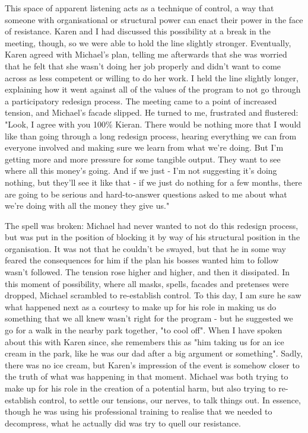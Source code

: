This space of apparent listening acts as a technique of control, a way that someone with organisational or structural power can enact their power in the face of resistance. Karen and I had discussed this possibility at a break in the meeting, though, so we were able to hold the line slightly stronger. Eventually, Karen agreed with Michael's plan, telling me afterwards that she was worried that he felt that she wasn't doing her job properly and didn't want to come across as less competent or willing to do her work. I held the line slightly longer, explaining how it went against all of the values of the program to not go through a participatory redesign process. The meeting came to a point of increased tension, and Michael's facade slipped. He turned to me, frustrated and flustered:
"Look, I agree with you 100\% Kieran. There would be nothing more that I would like than going through a long redesign process, hearing everything we can from everyone involved and making sure we learn from what we're doing. But I'm getting more and more pressure for some tangible output. They want to see where all this money's going. And if we just - I'm not suggesting it's doing nothing, but they'll see it like that - if we just do nothing for a few months, there are going to be serious and hard-to-answer questions asked to me about what we're doing with all the money they give us."

The spell was broken: Michael had never wanted to not do this redesign process, but was put in the position of blocking it by way of his structural position in the organisation. It was not that he couldn't be swayed, but that he in some way feared the consequences for him if the plan his bosses wanted him to follow wasn't followed. The tension rose higher and higher, and then it dissipated. In this moment of possibility, where all masks, spells, facades and pretenses were dropped, Michael scrambled to re-establish control. To this day, I am sure he saw what happened next as a courtesy to make up for his role in making us do something that we all knew wasn't right for the program - but he suggested we go for a walk in the nearby park together, "to cool off". When I have spoken about this with Karen since, she remembers this as "him taking us for an ice cream in the park, like he was our dad after a big argument or something". Sadly, there was no ice cream, but Karen's impression of the event is somehow closer to the truth of what was happening in that moment. Michael was both trying to make up for his role in the creation of a potential harm, but also trying to re-establish control, to settle our tensions, our nerves, to talk things out. In essence, though he was using his professional training to realise that we needed to decompress, what he actually did was try to quell our resistance.

